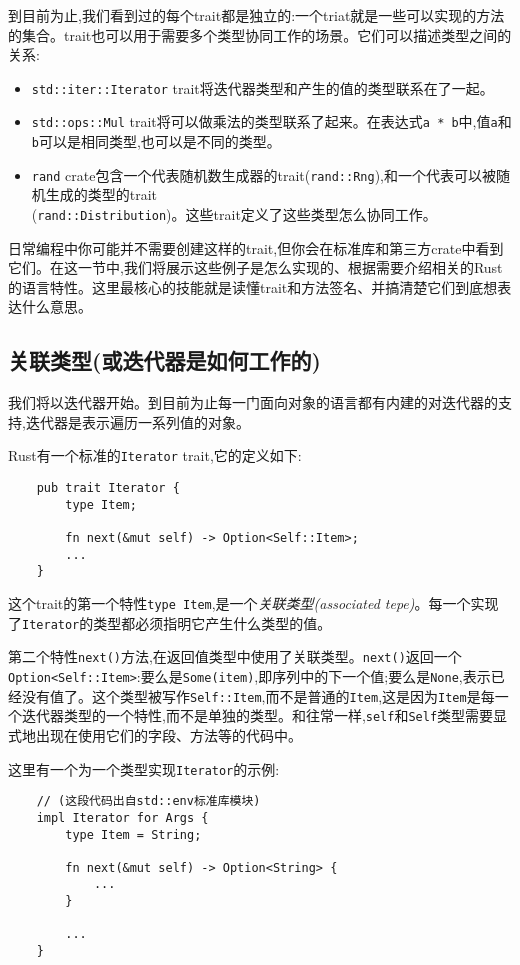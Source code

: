到目前为止,我们看到过的每个trait都是独立的:一个triat就是一些可以实现的方法的集合。trait也可以用于需要多个类型协同工作的场景。它们可以描述类型之间的关系:
\begin{itemize}
    \item \texttt{std::iter::Iterator} trait将迭代器类型和产生的值的类型联系在了一起。
    \item \texttt{std::ops::Mul} trait将可以做乘法的类型联系了起来。在表达式\texttt{a * b}中,值\texttt{a}和\texttt{b}可以是相同类型,也可以是不同的类型。
    \item \texttt{rand} crate包含一个代表随机数生成器的trait(\texttt{rand::Rng}),和一个代表可以被随机生成的类型的trait\\
    (\texttt{rand::Distribution})。这些trait定义了这些类型怎么协同工作。
\end{itemize}

日常编程中你可能并不需要创建这样的trait,但你会在标准库和第三方crate中看到它们。在这一节中,我们将展示这些例子是怎么实现的、根据需要介绍相关的Rust的语言特性。这里最核心的技能就是读懂trait和方法签名、并搞清楚它们到底想表达什么意思。

\subsection{关联类型(或迭代器是如何工作的)}
我们将以迭代器开始。到目前为止每一门面向对象的语言都有内建的对迭代器的支持,迭代器是表示遍历一系列值的对象。

Rust有一个标准的\texttt{Iterator} trait,它的定义如下:
\begin{verbatim}
    pub trait Iterator {
        type Item;

        fn next(&mut self) -> Option<Self::Item>;
        ...
    }
\end{verbatim}

这个trait的第一个特性\texttt{type Item},是一个\emph{关联类型(associated tepe)}。每一个实现了\texttt{Iterator}的类型都必须指明它产生什么类型的值。

第二个特性\texttt{next()}方法,在返回值类型中使用了关联类型。\texttt{next()}返回一个\texttt{Option<Self::Item>}:要么是\texttt{Some(item)},即序列中的下一个值;要么是\texttt{None},表示已经没有值了。这个类型被写作\texttt{Self::Item},而不是普通的\texttt{Item},这是因为\texttt{Item}是每一个迭代器类型的一个特性,而不是单独的类型。和往常一样,\texttt{self}和\texttt{Self}类型需要显式地出现在使用它们的字段、方法等的代码中。

这里有一个为一个类型实现\texttt{Iterator}的示例:
\begin{verbatim}
    // (这段代码出自std::env标准库模块)
    impl Iterator for Args {
        type Item = String;

        fn next(&mut self) -> Option<String> {
            ...
        }

        ...
    }
\end{verbatim}


